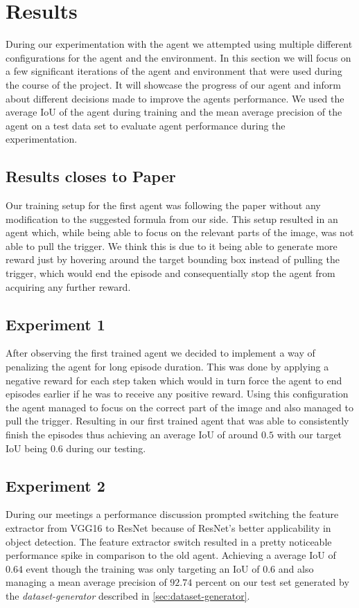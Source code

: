 \section{Results}
During our experimentation with the agent we attempted using multiple different configurations for the agent and the environment.
In this section we will focus on a few significant iterations of the agent and environment that were used during the course of the project.
It will showcase the progress of our agent and inform about different decisions made to improve the agents performance.
We used the average IoU of the agent during training and the mean average precision of the agent on a test data set to evaluate agent performance during the experimentation.


\subsection{Results closes to Paper}
Our training setup for the first agent was following the paper\cite{caicedo2015active} without any modification to the suggested formula from our side.
This setup resulted in an agent which, while being able to focus on the relevant parts of the image, was not able to pull the trigger.
We think this is due to it being able to generate more reward just by hovering around the target bounding box instead of pulling the trigger, which would end the episode and consequentially stop the agent from acquiring any further reward.

\subsection{Experiment 1}
After observing the first trained agent we decided to implement a way of penalizing the agent for long episode duration.
This was done by applying a negative reward for each step taken which would in turn force the agent to end episodes earlier if he was to receive any positive reward.
Using this configuration the agent managed to focus on the correct part of the image and also managed to pull the trigger.
Resulting in our first trained agent that was able to consistently finish the episodes thus achieving an average IoU of around $0.5$ with our target IoU being $0.6$ during our testing.

\subsection{Experiment 2}
During our meetings a performance discussion prompted switching the feature extractor from VGG16\cite{VGG16} to ResNet\cite{ResNet} because of ResNet's better applicability in object detection.
The feature extractor switch resulted in a pretty noticeable performance spike in comparison to the old agent.
Achieving a average IoU of $0.64$ event though the training was only targeting an IoU of $0.6$ and also managing a mean average precision of $92.74$ percent on our test set generated by the \textit{dataset-generator} described in \ref{sec:dataset-generator}.